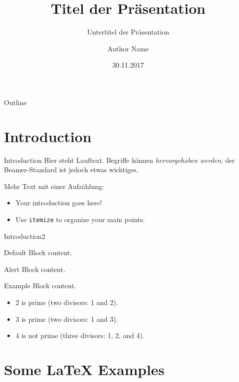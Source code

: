 \documentclass[10pt]{beamer}
\title[HAW Hamburg Beamer]{Titel der Präsentation}
\subtitle{Untertitel der Präsentation}
\author{Author Name}
\institute{Hochschule für Angewandte Wissenschaften Hamburg}
\date{30.11.2017}
\begin{document}
\maketitle

\begin{frame}{Outline}
  \tableofcontents
\end{frame}

\section{Introduction}
\begin{frame}[allowframebreaks]{Introduction}
  Hier steht Lauftext. Begriffe können \emph{hervorgehoben werden}, der Beamer-Standard ist jedoch \alert{etwas wichtiges}.

  Mehr Text mit einer Aufzählung:
  \begin{itemize}
    \item Your introduction goes here!
    \item Use \texttt{itemize} to organize your main points.
  \end{itemize}
\end{frame}

\begin{frame}{Introduction2}
  \begin{block}{Default}
    Block content.
  \end{block}
  \begin{alertblock}{Alert}
    Block content.
  \end{alertblock}
  \begin{exampleblock}{Example}
    Block content.
  \end{exampleblock}
  \begin{example}
    \begin{itemize}
      \item 2 is prime (two divisors: 1 and 2).
      \item 3 is prime (two divisors: 1 and 3).
      \item 4 is not prime (\alert{three} divisors: 1, 2, and 4).
    \end{itemize}
  \end{example}
\end{frame}


\section{Some \LaTeX{} Examples}
\end{document}
